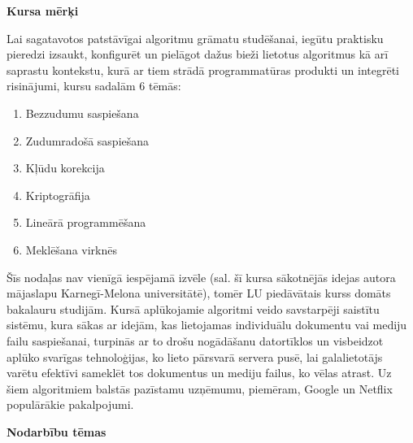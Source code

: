 \documentclass[11pt]{article}
\begin{document}
\vspace{10pt}
{\large \bf Kursa mērķi}

Lai sagatavotos patstāvīgai algoritmu grāmatu studēšanai, iegūtu 
praktisku pieredzi izsaukt, konfigurēt un pielāgot dažus bieži lietotus algoritmus
kā arī saprastu kontekstu, kurā ar tiem strādā programmatūras produkti un integrēti 
risinājumi, kursu sadalām 6 tēmās: 

\begin{enumerate}
\item Bezzudumu saspiešana
\item Zudumradošā saspiešana
\item Kļūdu korekcija
\item Kriptogrāfija
\item Lineārā programmēšana
\item Meklēšana virknēs
\end{enumerate}

Šīs nodaļas nav vienīgā iespējamā izvēle (sal. \cite{GuyBlelloch} \textendash{} šī kursa sākotnējās
idejas autora mājaslapu Karnegī-Melona universitātē), tomēr LU piedāvātais kurss domāts bakalauru 
studijām. Kursā aplūkojamie algoritmi veido savstarpēji saistītu sistēmu, kura sākas ar idejām, kas
lietojamas individuālu dokumentu vai mediju failu saspiešanai, turpinās ar to drošu nogādāšanu 
datortīklos un visbeidzot aplūko svarīgas tehnoloģijas, ko lieto pārsvarā servera pusē, lai 
galalietotājs varētu efektīvi sameklēt tos dokumentus un mediju failus, ko vēlas atrast.
Uz šiem algoritmiem balstās pazīstamu uzņēmumu, piemēram, Google un Netflix populārākie pakalpojumi. 






\vspace{10pt}
{\large \bf Nodarbību tēmas}
\end{document}
